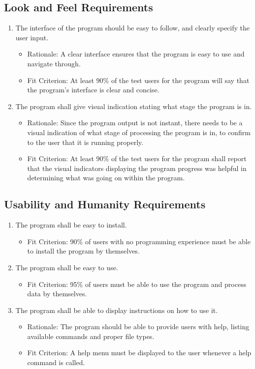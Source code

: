 \documentclass[12pt, titlepage]{article}
\begin{document}
\subsection{Look and Feel Requirements}
\begin{enumerate}[{LF}1. ] 
    \item \label{LF1} The interface of the program should be easy to follow, and clearly specify the user input.
    \begin{itemize} 
        \item Rationale: A clear interface ensures that the program is easy to use and navigate through.
        \item Fit Criterion: At least 90\% of the test users for the program will say that the program's interface is clear and concise.
    \end{itemize}  
    \item \label{LF2} The program shall give visual indication stating what stage the program is in.
    \begin{itemize} 
        \item Rationale: Since the program output is not instant, there needs to be a visual indication of what stage of processing the program is in, to confirm to the user that it is running properly.
        \item Fit Criterion: At least 90\% of the test users for the program shall report that the visual indicators displaying the program progress was helpful in determining what was going on within the program.
    \end{itemize}
\end{enumerate}

\subsection{Usability and Humanity Requirements}
\begin{enumerate}[{UH}1. ]
\item \label{UH1} The program shall be easy to install.
    \begin{itemize}
        \item Fit Criterion: 90\% of users with no programming experience must be able to install the program by themselves.
\end{itemize}
\item \label{UH2} The program shall be easy to use.
    \begin{itemize}
        \item Fit Criterion: 95\% of users must be able to use the program and process data by themselves.
\end{itemize}
\item \label{UH3} The program shall be able to display instructions on how to use it.
    \begin{itemize} 
        \item Rationale: The program should be able to provide users with help, listing available commands and proper file types.
        \item Fit Criterion: A help menu must be displayed to the user whenever a help command is called.
\end{itemize}
\end{enumerate}
\end{document}
